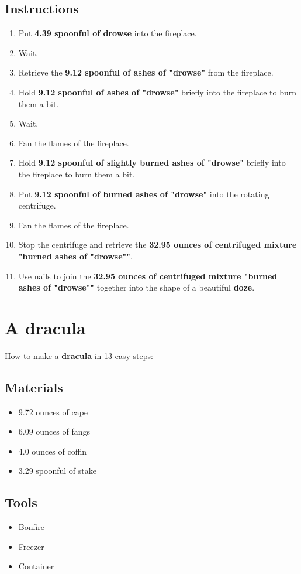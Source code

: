 \documentclass{article}
\begin{document}
\subsection{Instructions}\begin{enumerate}
\item 
Put \textbf{4.39 spoonful of drowse} into the fireplace.
\item 
Wait.
\item 
Retrieve the \textbf{9.12 spoonful of ashes of "drowse"} from the fireplace.
\item 
Hold \textbf{9.12 spoonful of ashes of "drowse"} briefly into the fireplace to burn them a bit.
\item 
Wait.
\item 
Fan the flames of the fireplace.
\item 
Hold \textbf{9.12 spoonful of slightly burned ashes of "drowse"} briefly into the fireplace to burn them a bit.
\item 
Put \textbf{9.12 spoonful of burned ashes of "drowse"} into the rotating centrifuge.
\item 
Fan the flames of the fireplace.
\item 
Stop the centrifuge and retrieve the \textbf{32.95 ounces of centrifuged mixture "burned ashes of "drowse""}.
\item 
Use nails to join the \textbf{32.95 ounces of centrifuged mixture "burned ashes of "drowse""} together into the shape of a beautiful \textbf{doze}.
\end{enumerate}
\newpage
\section{A dracula}How to make a \textbf{dracula} in 13 easy steps:

\subsection{Materials}\begin{itemize}
\item 
9.72 ounces of cape
\item 
6.09 ounces of fangs
\item 
4.0 ounces of coffin
\item 
3.29 spoonful of stake
\end{itemize}
\subsection{Tools}\begin{itemize}
\item 
Bonfire
\item 
Freezer
\item 
Container
\end{itemize}
\end{document}
